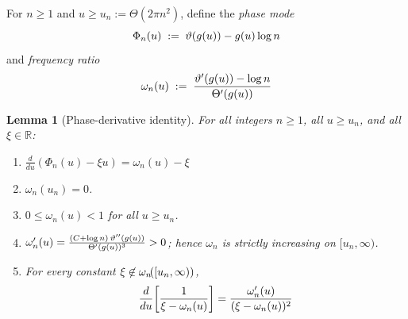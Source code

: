 \documentclass{amsart}
\newcommand{\assign}{:=}
\newcommand{\nin}{\not\in}
\newcommand{\tmem}[1]{{\em #1\/}}
\newcommand{\tmtextup}[1]{\text{{\upshape{#1}}}}
\newtheorem{lemma}{Lemma}
\begin{document}
For $n \ge 1$ and $u \ge u_n \assign \Theta (2 \pi n^2)$, define the
{\tmem{phase mode}}
\begin{equation}
  \label{eq:Phi-omega} \Phi_n (u) \hspace{0.27em} \assign \hspace{0.27em}
  \vartheta (g (u)) - g (u) \log n
\end{equation}
and {\tmem{frequency ratio}}
\begin{equation}
  \omega_n (u) \hspace{0.27em} \assign \hspace{0.27em} \frac{\vartheta' (g
  (u)) - \log n}{\Theta' (g (u))}
\end{equation}
\begin{lemma}
  [Phase-derivative identity]\label{lem:phase} For all integers $n \ge 1$, all
  $u \ge u_n$, and all $\xi \in \mathbb{R}$:
  \begin{enumerate}
    \item[\tmtextup{(a)}] $\frac{d}{du}  (\Phi_n (u) - \xi u) = \omega_n (u) -
    \xi$
    
    \item[\tmtextup{(b)}] $\omega_n (u_n) = 0$.
    
    \item[\tmtextup{(c)}] $0 \le \omega_n (u) < 1$ for all $u \ge u_n$.
    
    \item[\tmtextup{(d)}] $\omega_n' (u) = \frac{(C + \log n)  \hspace{0.17em}
    \vartheta'' (g (u))}{\Theta' (g (u))^3} > 0$; hence $\omega_n$ is strictly
    increasing on $[u_n, \infty)$.
    
    \item[\tmtextup{(e)}] For every constant $\xi \nin \omega_n
    \hspace{-0.17em} ([u_n, \infty))$,
    \begin{equation}
      \frac{d}{du} \hspace{-0.17em} \left[ \frac{1}{\xi - \omega_n (u)}
      \right] = \frac{\omega_n' (u)}{(\xi - \omega_n (u))^2}
    \end{equation}
  \end{enumerate}
\end{lemma}
\end{document}
